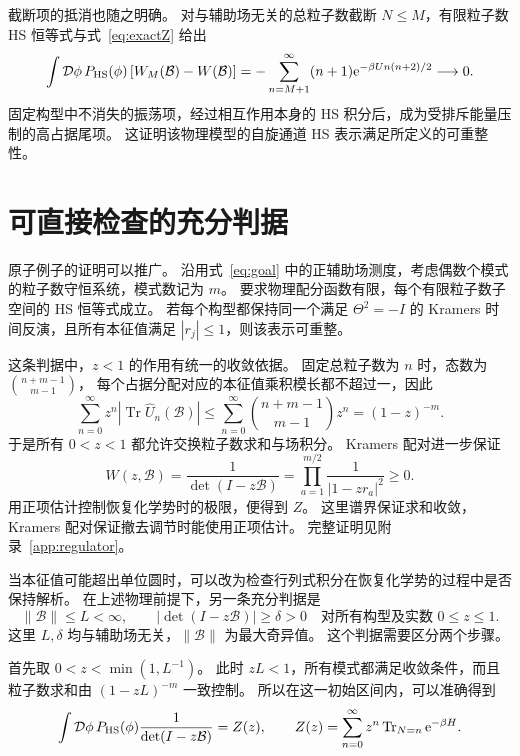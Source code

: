 \documentclass[UTF8,11pt,a4paper,fontset=fandol]{ctexart}
\newcommand{\Tr}{\operatorname{Tr}}
\newcommand{\ee}{\mathrm e}
\numberwithin{equation}{section}
\begin{document}
截断项的抵消也随之明确。
对与辅助场无关的总粒子数截断 $N\le M$，有限粒子数 HS 恒等式与式~\eqref{eq:exactZ} 给出
\begin{equation}
 \int\mathcal D\phi\,P_{\rm HS}(\phi)\,[W_M(\mathcal B)-W(\mathcal B)]
 =-\sum_{n=M+1}^{\infty}(n+1)\ee^{-\beta U n(n+2)/2}
 \longrightarrow0.
 \label{eq:tail}
\end{equation}
固定构型中不消失的振荡项，经过相互作用本身的 HS 积分后，成为受排斥能量压制的高占据尾项。
这证明该物理模型的自旋通道 HS 表示满足所定义的可重整性。

\section{可直接检查的充分判据}

原子例子的证明可以推广。
沿用式~\eqref{eq:goal} 中的正辅助场测度，考虑偶数个模式的粒子数守恒系统，模式数记为 $m$。
要求物理配分函数有限，每个有限粒子数子空间的 HS 恒等式成立。
若每个构型都保持同一个满足 $\Theta^2=-I$ 的 Kramers 时间反演，且所有本征值满足 $|r_j|\le1$，则该表示可重整。

这条判据中，$z<1$ 的作用有统一的收敛依据。
固定总粒子数为 $n$ 时，态数为 $\binom{n+m-1}{m-1}$，
每个占据分配对应的本征值乘积模长都不超过一，因此
\begin{equation}
 \sum_{n=0}^{\infty}z^n
 \left|\Tr\hat U_n(\mathcal B)\right|
 \le\sum_{n=0}^{\infty}
 \binom{n+m-1}{m-1}z^n
 =(1-z)^{-m}.
 \label{eq:general_uniform_convergence}
\end{equation}
于是所有 $0<z<1$ 都允许交换粒子数求和与场积分。
Kramers 配对进一步保证
\begin{equation}
 W(z,\mathcal B)=\frac1{\det(I-z\mathcal B)}
 =\prod_{a=1}^{m/2}\frac1{|1-zr_a|^2}\ge0.
 \label{eq:unitarycriterion}
\end{equation}
用正项估计控制恢复化学势时的极限，便得到 $Z$。
这里谱界保证求和收敛，Kramers 配对保证撤去调节时能使用正项估计。
完整证明见附录~\ref{app:regulator}。

当本征值可能超出单位圆时，可以改为检查行列式积分在恢复化学势的过程中是否保持解析。
在上述物理前提下，另一条充分判据是
\begin{equation}
 \|\mathcal B\|\le L<\infty,\qquad
 |\det(I-z\mathcal B)|\ge\delta>0
 \quad\text{对所有构型及实数 }0\le z\le1.
 \label{eq:generalcriterion}
\end{equation}
这里 $L,\delta$ 均与辅助场无关，$\|\mathcal B\|$ 为最大奇异值。
这个判据需要区分两个步骤。

首先取 $0<z<\min(1,L^{-1})$。
此时 $zL<1$，所有模式都满足收敛条件，而且粒子数求和由
$(1-zL)^{-m}$ 一致控制。
所以在这一初始区间内，可以准确得到
\begin{equation}
 \int\mathcal D\phi\,P_{\rm HS}(\phi)
 \frac1{\det(I-z\mathcal B)}
 =Z(z),\qquad
 Z(z)=\sum_{n=0}^{\infty}z^n\Tr_{N=n}\ee^{-\beta H}.
 \label{eq:initial_z_identity}
\end{equation}
\end{document}

